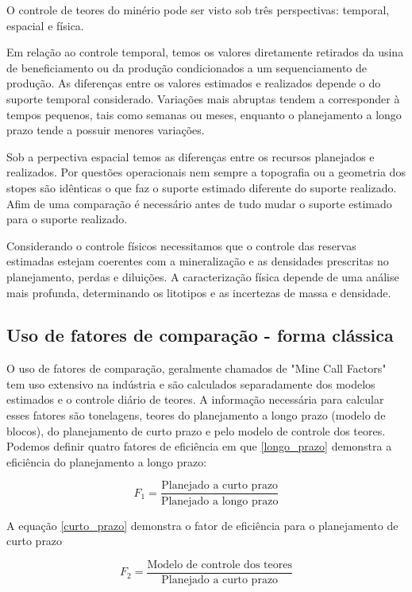  O controle de teores do minério pode ser visto sob três perspectivas: temporal, espacial e física. 
 
 Em relação ao controle temporal, temos os valores diretamente retirados da usina de beneficiamento ou da produção condicionados a um sequenciamento de produção. As diferenças entre os valores estimados e realizados depende o do suporte temporal considerado. Variações mais abruptas tendem a corresponder à tempos pequenos, tais como semanas ou meses, enquanto o planejamento a longo prazo tende a possuir menores variações.
 
  
 Sob a perpectiva espacial temos as diferenças entre os recursos planejados e realizados. Por questões operacionais nem sempre a topografia ou a geometria dos stopes são idênticas o que faz o suporte estimado diferente do suporte realizado. Afim de uma comparação é necessário antes de tudo mudar o suporte estimado para o suporte realizado. 
 
 Considerando o controle físicos necessitamos que o controle das reservas estimadas estejam coerentes com a mineralização e as densidades prescritas no planejamento, perdas e diluições. A caracterização física depende de uma análise mais profunda, determinando os litotipos e as incertezas de massa e densidade. 
 
 \subsection{Uso de fatores de comparação - forma clássica}
 
 O uso de fatores de comparação, geralmente chamados de "Mine Call Factors" tem uso extensivo na indústria e são calculados separadamente dos modelos estimados e o controle diário de teores. A informação necessária para calcular esses fatores são tonelagens, teores do planejamento a longo prazo (modelo de blocos), do planejamento de curto prazo e pelo modelo de controle dos teores. Podemos definir quatro fatores de eficiência em que  \eqref{longo_prazo} demonstra a eficiência do planejamento a longo prazo:
 
 \begin{equation} \label{longo_prazo}
	 F_{1} = \frac{\text{Planejado a curto prazo}}{\text{Planejado a longo prazo}}
 \end{equation} 
 
 A equação \eqref{curto_prazo} demonstra o fator de eficiência para o planejamento de curto prazo
 
  \begin{equation} \label{curto_prazo}
  F_{2} = \frac{\textrm{Modelo de controle dos teores}}{\textrm{Planejado a curto prazo}}
  \end{equation}
  
